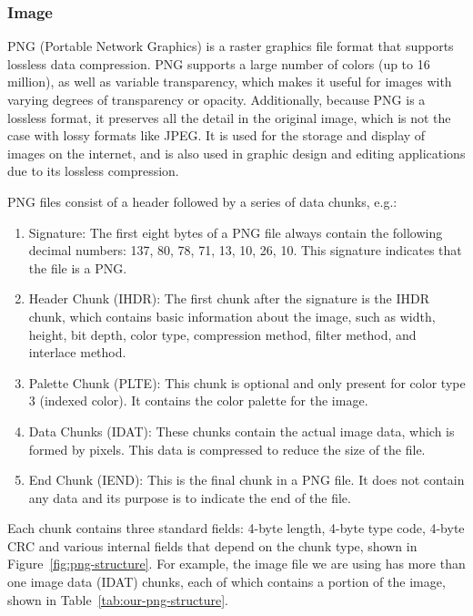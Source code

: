 \documentclass{article}
\begin{document}
\subsubsection{Image}
PNG (Portable Network Graphics) is a raster graphics file format that supports lossless data compression. 
PNG supports a large number of colors (up to 16 million), as well as variable transparency, which makes it useful for images with varying degrees of transparency or opacity. 
Additionally, because PNG is a lossless format, it preserves all the detail in the original image, which is not the case with lossy formats like JPEG. 
It is used for the storage and display of images on the internet, and is also used in graphic design and editing applications due to its lossless compression.

PNG files consist of a header followed by a series of data chunks, e.g.:
\begin{enumerate}
    \item Signature: The first eight bytes of a PNG file always contain the following decimal numbers: 137, 80, 78, 71, 13, 10, 26, 10. This signature indicates that the file is a PNG.
    \item Header Chunk (IHDR): The first chunk after the signature is the IHDR chunk, which contains basic information about the image, such as width, height, bit depth, color type, compression method, filter method, and interlace method.
    \item Palette Chunk (PLTE): This chunk is optional and only present for color type 3 (indexed color). It contains the color palette for the image.
    \item Data Chunks (IDAT): These chunks contain the actual image data, which is formed by pixels. This data is compressed to reduce the size of the file.
    \item End Chunk (IEND): This is the final chunk in a PNG file. It does not contain any data and its purpose is to indicate the end of the file.
\end{enumerate}
Each chunk contains three standard fields: 4-byte length, 4-byte type code, 4-byte CRC and various internal fields that depend on the chunk type, shown in Figure~\ref{fig:png-structure}. 
For example, the image file we are using has more than one image data (IDAT) chunks, each of which contains a portion of the image, shown in Table~\ref{tab:our-png-structure}.
\end{document}
